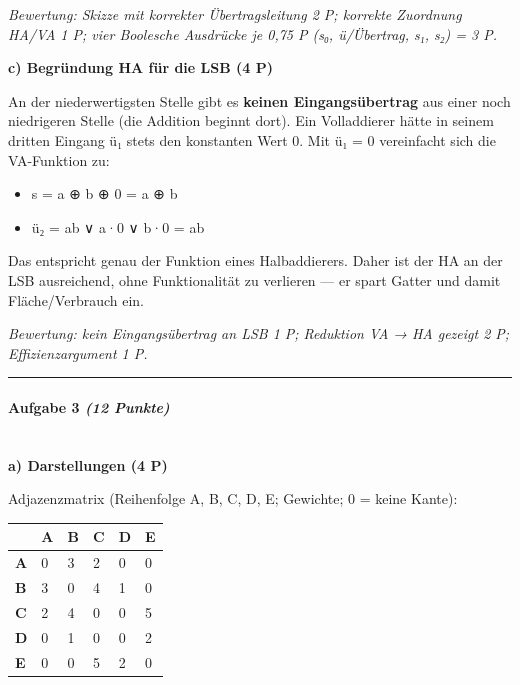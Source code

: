 \documentclass[11pt, a4paper]{article}
\begin{document}
\textit{Bewertung: Skizze mit korrekter Übertragsleitung 2 P; korrekte Zuordnung HA/VA 1 P; vier Boolesche Ausdrücke je 0,75 P (s₀, ü/Übertrag, s₁, s₂) = 3 P.}


\textbf{c) Begründung HA für die LSB (4 P)}


An der niederwertigsten Stelle gibt es \textbf{keinen Eingangsübertrag} aus einer noch niedrigeren Stelle (die Addition beginnt dort). Ein Volladdierer hätte in seinem dritten Eingang ü₁ stets den konstanten Wert 0. Mit ü₁ = 0 vereinfacht sich die VA-Funktion zu:

\begin{itemize}
  \item s = a ⊕ b ⊕ 0 = a ⊕ b
  \item ü₂ = ab ∨ a·0 ∨ b·0 = ab
\end{itemize}

Das entspricht genau der Funktion eines Halbaddierers. Daher ist der HA an der LSB ausreichend, ohne Funktionalität zu verlieren — er spart Gatter und damit Fläche/Verbrauch ein.


\textit{Bewertung: kein Eingangsübertrag an LSB 1 P; Reduktion VA → HA gezeigt 2 P; Effizienzargument 1 P.}



\noindent\textcolor{rulegray}{\rule{\linewidth}{0.4pt}}


\paragraph{Aufgabe 3 \textit{(12 Punkte)}}\mbox{}\\[2pt]

\textbf{a) Darstellungen (4 P)}


Adjazenzmatrix (Reihenfolge A, B, C, D, E; Gewichte; 0 = keine Kante):



{\small
\begin{tabularx}{\linewidth}{XXXXXX}
\hline
\rowcolor{tableheadbg}
{\color{white}\textbf{}} & {\color{white}\textbf{A}} & {\color{white}\textbf{B}} & {\color{white}\textbf{C}} & {\color{white}\textbf{D}} & {\color{white}\textbf{E}} \\[2pt]
\hline
\endhead
\hline
\endfoot
\textbf{A} & 0 & 3 & 2 & 0 & 0 \\
\textbf{B} & 3 & 0 & 4 & 1 & 0 \\
\textbf{C} & 2 & 4 & 0 & 0 & 5 \\
\textbf{D} & 0 & 1 & 0 & 0 & 2 \\
\textbf{E} & 0 & 0 & 5 & 2 & 0 \\
\end{tabularx}
}
\end{document}
